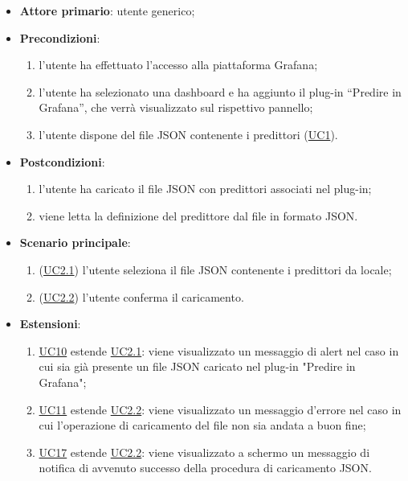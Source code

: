 		\begin{itemize}
			\item\textbf{Attore primario}: utente generico;
			\item\textbf{Precondizioni}:
				\begin{enumerate}
					\item l’utente ha effettuato l’accesso alla piattaforma Grafana;
					\item l’utente ha selezionato una dashboard e ha aggiunto il plug-in “Predire in Grafana”, che verrà visualizzato sul rispettivo pannello;
					\item l’utente dispone del file JSON contenente i predittori (\hyperref[par:UC1]{UC1}).
				\end{enumerate}
			\item\textbf{Postcondizioni}:
				\begin{enumerate}
					\item l’utente ha caricato il file JSON con predittori associati nel plug-in;
					\item viene letta la definizione del predittore dal file in formato JSON.
				\end{enumerate}
			\item\textbf{Scenario principale}:
				\begin{enumerate}
					\item (\hyperref[par:UC2.1]{UC2.1}) l’utente seleziona il file JSON contenente i predittori da locale;
					\item (\hyperref[par:UC2.2]{UC2.2}) l'utente conferma il caricamento.
				\end{enumerate}
			\item\textbf{Estensioni}:
				\begin{enumerate}
					\item\hyperref[par:UC10]{UC10} estende \hyperref[par:UC2.1]{UC2.1}: viene visualizzato un messaggio di alert nel caso in cui sia già presente un file JSON caricato nel plug-in "Predire in Grafana";
					\item\hyperref[par:UC11]{UC11} estende \hyperref[par:UC2.2]{UC2.2}: viene visualizzato un messaggio d’errore nel caso in cui l’operazione di caricamento del file non sia andata a buon fine;
					\item\hyperref[par:UC17]{UC17} estende \hyperref[par:UC2.2]{UC2.2}: viene visualizzato a schermo un messaggio di notifica di avvenuto successo della procedura di caricamento JSON.
				\end{enumerate}	
			
		\end{itemize}
		
